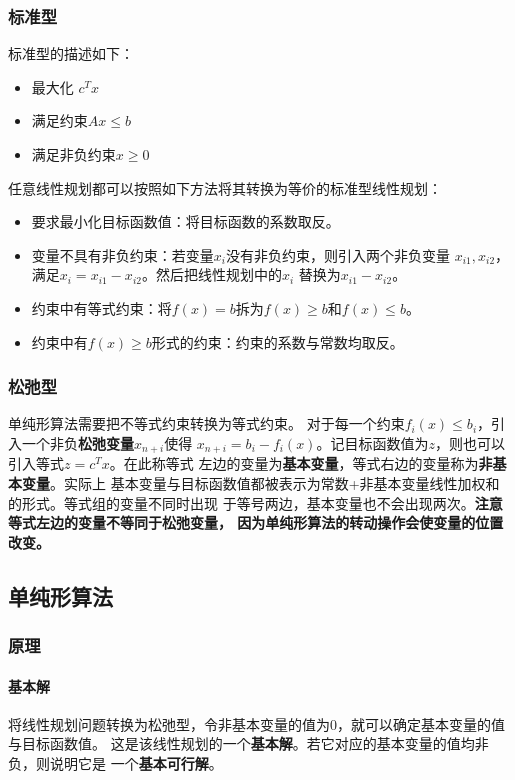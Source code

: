 \subsubsection{标准型}
标准型的描述如下：
\begin{itemize}
    \item 最大化 $c^Tx$
    \item 满足约束$Ax\leq b$
    \item 满足非负约束$x\geq 0$
\end{itemize}

任意线性规划都可以按照如下方法将其转换为等价的标准型线性规划：
\begin{itemize}
    \item 要求最小化目标函数值：将目标函数的系数取反。
    \item 变量不具有非负约束：若变量$x_i$没有非负约束，则引入两个非负变量
    $x_{i1},x_{i2}$，满足$x_i=x_{i1}-x_{i2}$。然后把线性规划中的$x_i$
    替换为$x_{i1}-x_{i2}$。
    \item 约束中有等式约束：将$f(x)=b$拆为$f(x)\geq b$和$f(x)\leq b$。
    \item 约束中有$f(x)\geq b$形式的约束：约束的系数与常数均取反。
\end{itemize}
\subsubsection{松弛型}
单纯形算法需要把不等式约束转换为等式约束。
对于每一个约束$f_i(x)\leq b_i$，引入一个非负{\bfseries 松弛变量}$x_{n+i}$使得
$x_{n+i}=b_i-f_i(x)$。记目标函数值为$z$，则也可以引入等式$z=c^Tx$。在此称等式
左边的变量为{\bfseries 基本变量}，等式右边的变量称为{\bfseries 非基本变量}。实际上
基本变量与目标函数值都被表示为常数+非基本变量线性加权和的形式。等式组的变量不同时出现
于等号两边，基本变量也不会出现两次。{\bfseries 注意等式左边的变量不等同于松弛变量，
因为单纯形算法的转动操作会使变量的位置改变。}
\subsection{单纯形算法}
\subsubsection{原理}
\paragraph{基本解}
将线性规划问题转换为松弛型，令非基本变量的值为0，就可以确定基本变量的值与目标函数值。
这是该线性规划的一个{\bfseries 基本解}。若它对应的基本变量的值均非负，则说明它是
一个{\bfseries 基本可行解}。

